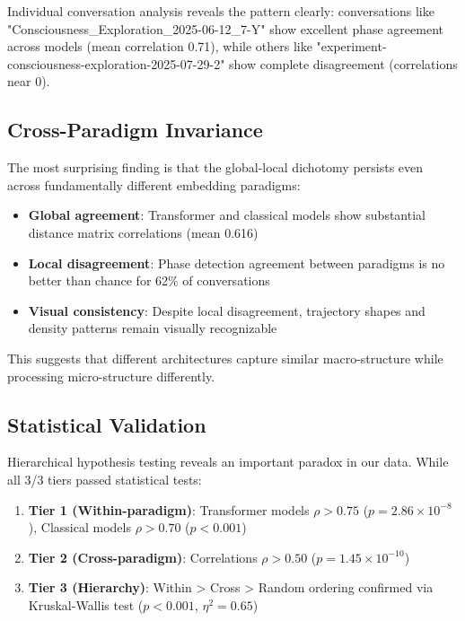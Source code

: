 \documentclass[11pt,letterpaper]{article}
\newcommand{\crossParadigmCorr}{0.616}
\newcommand{\tiersPassed}{3/3}
\begin{document}
Individual conversation analysis reveals the pattern clearly: conversations like "Consciousness\_Exploration\_2025-06-12\_7-Y" show excellent phase agreement across models (mean correlation 0.71), while others like "experiment-consciousness-exploration-2025-07-29-2" show complete disagreement (correlations near 0).

\subsection{Cross-Paradigm Invariance}

The most surprising finding is that the global-local dichotomy persists even across fundamentally different embedding paradigms:

\begin{itemize}
\item \textbf{Global agreement}: Transformer and classical models show substantial distance matrix correlations (mean \crossParadigmCorr{})
\item \textbf{Local disagreement}: Phase detection agreement between paradigms is no better than chance for 62\% of conversations
\item \textbf{Visual consistency}: Despite local disagreement, trajectory shapes and density patterns remain visually recognizable
\end{itemize}

This suggests that different architectures capture similar macro-structure while processing micro-structure differently.

\subsection{Statistical Validation}

Hierarchical hypothesis testing reveals an important paradox in our data. While all \tiersPassed{} tiers passed statistical tests:

\begin{enumerate}
\item \textbf{Tier 1 (Within-paradigm)}: Transformer models $\rho > 0.75$ ($p = 2.86 \times 10^{-8}$), Classical models $\rho > 0.70$ ($p < 0.001$)
\item \textbf{Tier 2 (Cross-paradigm)}: Correlations $\rho > 0.50$ ($p = 1.45 \times 10^{-10}$)
\item \textbf{Tier 3 (Hierarchy)}: Within > Cross > Random ordering confirmed via Kruskal-Wallis test ($p < 0.001$, $\eta^2 = 0.65$)
\end{enumerate}
\end{document}
